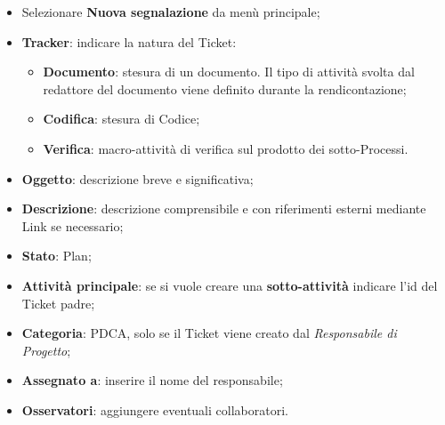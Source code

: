 \begin{itemize}


\item Selezionare \textbf{Nuova segnalazione} da menù principale; 
\item \textbf{Tracker}: indicare la natura del Ticket: 
	\begin{itemize}
	\item \textbf{Documento}: stesura di un documento. Il tipo di attività svolta dal redattore del documento viene definito durante la rendicontazione; 
	\item \textbf{Codifica}: stesura di Codice; 
	\item \textbf{Verifica}: macro-attività di verifica sul prodotto dei sotto-Processi. 


	\end{itemize}

\item \textbf{Oggetto}: descrizione breve e significativa; 
\item \textbf{Descrizione}: descrizione comprensibile e con riferimenti esterni mediante Link se necessario; 
\item \textbf{Stato}: Plan; 
\item \textbf{Attività principale}: se si vuole creare una \textbf{sotto-attività} indicare l’id del Ticket 
padre; 
\item \textbf{Categoria}: PDCA, solo se il Ticket viene creato dal \emph{Responsabile di Progetto}; 
\item \textbf{Assegnato a}: inserire il nome del responsabile; 
\item \textbf{Osservatori}: aggiungere eventuali collaboratori.
\end{itemize}  


